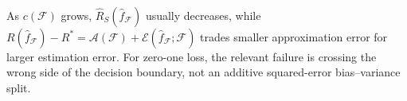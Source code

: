 \begin{remark} \label{rem:sl-model-complexity-tradeoff} \\
As $c(\mathcal{F})$ grows, $\widehat{R}_S(\widehat{f}_{\mathcal{F}})$ usually decreases, while $R(\widehat{f}_{\mathcal{F}})-R^*=\mathcal{A}(\mathcal{F})+\mathcal{E}(\widehat{f}_{\mathcal{F}};\mathcal{F})$ trades smaller approximation error for larger estimation error.
For zero-one loss, the relevant failure is crossing the wrong side of the decision boundary, not an additive squared-error bias--variance split.
\end{remark}
